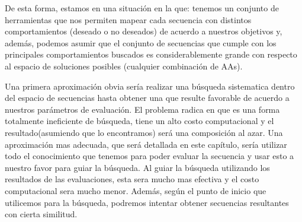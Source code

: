 % 
% 
% 
% 
% 
% 







De esta forma, estamos en una situación en la que: tenemos un conjunto de herramientas que nos permiten mapear cada secuencia con distintos comportamientos (deseado o no deseados) de acuerdo a nuestros objetivos y, además, 
podemos asumir que el conjunto de secuencias que cumple con los principales comportamientos buscados es considerablemente grande con respecto al espacio de soluciones posibles (cualquier combinación de AAs).

Una primera aproximación obvia sería realizar una búsqueda sistematica dentro del espacio de secuencias hasta obtener una que resulte favorable de acuerdo a nuestros parámetros de evaluación.  
El problema radica en que es una forma totalmente ineficiente de búsqueda, tiene un alto costo computacional y el resultado(asumiendo que lo encontramos) será una composición 
al azar.
Una aproximación mas adecuada, que será detallada en este capítulo, sería utilizar todo el conocimiento que tenemos para poder evaluar la secuencia y usar esto a nuestro favor para guiar la búsqueda. 
Al guiar la búsqueda utilizando los resultados de las evaluaciones, esta sera mucho mas efectiva y el costo computacional sera mucho menor.
Además, según el punto de inicio que utilicemos para la búsqueda, podremos intentar obtener secuencias resultantes con cierta similitud.

